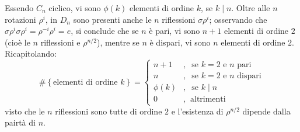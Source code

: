 \documentclass[11pt]{scrartcl}
\theoremstyle{style1}
\numberwithin{equation}{subsection}
\begin{document}
Essendo $C_n$ ciclico, vi sono $\phi (k)$ elementi di ordine $k$, se $k  \mid  n$.
Oltre alle $n$ rotazioni $\rho ^i$, in $D_n$ sono presenti anche le $n$ riflessioni $\sigma \rho ^i$; osservando che $\sigma \rho ^i \sigma \rho ^i = \rho ^{-i}\rho ^{i} = e $, si conclude che se $n$ \`e pari, vi sono $n+1$ elementi di ordine $2$ (cio\`e le $n$ riflessioni e $\rho ^{n / 2} $), mentre se $n$ \`e dispari, vi sono $n$ elementi di ordine $2$.
Ricapitolando:
\begin{equation}
\# \left\{ \text{elementi di ordine } k \right\} = \begin{cases}
	n + 1 &,\ \text{ se } k=2 \text{ e } n \text{ pari}\\
	n  &,\  \text{ se }k=2 \text{ e } n \text{ dispari}\\
	\phi (k)&,\ \text{ se } k \mid n\\
	0 &,\ \text{ altrimenti }
\end{cases}
\end{equation}
visto che le $n$ riflessioni sono tutte di ordine $2$ e l'esistenza di $\rho ^{n / 2} $ dipende dalla pairt\`a di $n$.
\vspace*{5pt}
\end{document}
